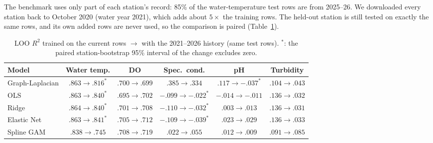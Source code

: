 \documentclass[12pt]{article}
\begin{document}
The benchmark uses only part of each station's record: 85\% of the water-temperature test rows are
from 2025--26. We downloaded every station back to October 2020 (water year 2021), which adds about
$5\times$ the training rows. The held-out station is still tested on exactly the same rows, and its
own added rows are never used, so the comparison is paired (Table~\ref{tab:hist}).

\begin{table}[H]
\centering
\caption{LOO $R^2$ trained on the current rows $\to$ with the 2021--2026 history (same test rows).
$^{*}$: the paired station-bootstrap 95\% interval of the change excludes zero.}
\label{tab:hist}
\begin{tabular}{l ccccc}
\toprule
Model & Water temp. & DO & Spec.\ cond. & pH & Turbidity \\
\midrule
Graph-Laplacian & $.863\to.816^{*}$ & $.700\to.699$ & $\mathbf{.385\to.334}$ & $.117\to-.037^{*}$ & $.104\to.043$ \\
OLS             & $.863\to.840^{*}$ & $.695\to.702$ & $-.099\to-.022^{*}$ & $-.014\to-.011$ & $.136\to.032$ \\
Ridge           & $.864\to.840^{*}$ & $.701\to.708$ & $-.110\to-.032^{*}$ & $.003\to.013$ & $.136\to.031$ \\
Elastic Net     & $.863\to.841^{*}$ & $.705\to.712$ & $-.109\to-.039^{*}$ & $.023\to.029$ & $.136\to.033$ \\
Spline GAM      & $.838\to.745$ & $.708\to.719$ & $.022\to.055$ & $.012\to.009$ & $.091\to.085$ \\
\bottomrule
\end{tabular}
\end{table}
\end{document}
